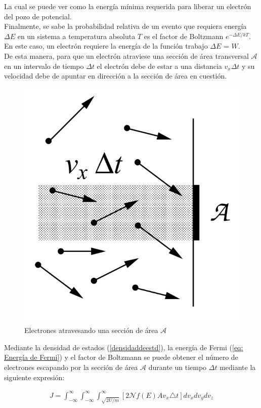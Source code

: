 \documentclass[%
 reprint,
 amsmath,amssymb,
 aps,
]{revtex4-2}
\begin{document}
\vspace{0.2 cm}
La cual se puede ver como la energía mínima requerida para liberar un electrón del pozo de potencial.
\\

Finalmente, se sabe  la probabilidad relativa de un evento que requiera energía $\Delta E$ en un sistema a temperatura absoluta $T$ es el factor de Boltzmann $e^{-\Delta E/kT}$. En este caso, un electrón requiere la energía de la función trabajo $\Delta E$ = $W$. 
\\

De esta manera, para que un electrón atraviese una sección de área transversal $\mathcal{A}$ en un intervalo de tiempo $\Delta t$ el electrón debe de estar a una distancia $v_{x}\Delta t$ y su velocidad debe de apuntar en dirección a la sección de área en cuestión.
\\

\begin{figure}[H]
    \centering
    \includegraphics[width=0.5\linewidth]{../src/imagenes/Opera Captura de pantalla_2024-03-13_211045_mail.google.com.png}
    \caption{Electrones atravesando una sección de área $\mathcal{A}$}
    \label{fig:4}
\end{figure}

Mediante la densidad de estados (\ref{densidaddeestd}), la energía de Fermi (\ref{eq: Energía de Fermi}) y el factor de Boltzmann se puede obtener el número de electrones escapando por la sección de área $\mathcal{A}$ durante un tiempo $\Delta t$ mediante la siguiente expresión:

\begin{align*}
    J= \int_{-\infty}^{\infty} \int_{-\infty}^{\infty} \int_{\sqrt{2U/m}}^{\infty}\left[2\mathcal{N}f(E)Av_{x}\triangle t \right] dv_{x}dv_{y}dv_{z}
\end{align*}
\end{document}
